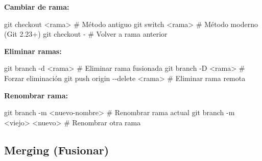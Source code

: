 \documentclass[
  doc,
  floatsintext,
  longtable,
  a4paper,
  nolmodern,
  notxfonts,
  notimes,
  12pt,
  colorlinks=true,linkcolor=blue,citecolor=blue,urlcolor=blue]{apa7}
\newenvironment{Shaded}{\begin{snugshade}}{\end{snugshade}}
\newcommand{\AttributeTok}[1]{\textcolor[rgb]{0.40,0.45,0.13}{#1}}
\newcommand{\CommentTok}[1]{\textcolor[rgb]{0.37,0.37,0.37}{#1}}
\newcommand{\FunctionTok}[1]{\textcolor[rgb]{0.28,0.35,0.67}{#1}}
\newcommand{\NormalTok}[1]{\textcolor[rgb]{0.00,0.23,0.31}{#1}}
\newcommand{\OperatorTok}[1]{\textcolor[rgb]{0.37,0.37,0.37}{#1}}
\begin{document}
\textbf{Cambiar de rama:}

\begin{Shaded}
\begin{Highlighting}[]
\FunctionTok{git}\NormalTok{ checkout }\OperatorTok{\textless{}}\NormalTok{rama}\OperatorTok{\textgreater{}}        \CommentTok{\# Método antiguo}
\FunctionTok{git}\NormalTok{ switch }\OperatorTok{\textless{}}\NormalTok{rama}\OperatorTok{\textgreater{}}          \CommentTok{\# Método moderno (Git 2.23+)}
\FunctionTok{git}\NormalTok{ checkout }\AttributeTok{{-}}             \CommentTok{\# Volver a rama anterior}
\end{Highlighting}
\end{Shaded}

\textbf{Eliminar ramas:}

\begin{Shaded}
\begin{Highlighting}[]
\FunctionTok{git}\NormalTok{ branch }\AttributeTok{{-}d} \OperatorTok{\textless{}}\NormalTok{rama}\OperatorTok{\textgreater{}}       \CommentTok{\# Eliminar rama fusionada}
\FunctionTok{git}\NormalTok{ branch }\AttributeTok{{-}D} \OperatorTok{\textless{}}\NormalTok{rama}\OperatorTok{\textgreater{}}       \CommentTok{\# Forzar eliminación}
\FunctionTok{git}\NormalTok{ push origin }\AttributeTok{{-}{-}delete} \OperatorTok{\textless{}}\NormalTok{rama}\OperatorTok{\textgreater{}}  \CommentTok{\# Eliminar rama remota}
\end{Highlighting}
\end{Shaded}

\textbf{Renombrar rama:}

\begin{Shaded}
\begin{Highlighting}[]
\FunctionTok{git}\NormalTok{ branch }\AttributeTok{{-}m} \OperatorTok{\textless{}}\NormalTok{nuevo{-}nombre}\OperatorTok{\textgreater{}}     \CommentTok{\# Renombrar rama actual}
\FunctionTok{git}\NormalTok{ branch }\AttributeTok{{-}m} \OperatorTok{\textless{}}\NormalTok{viejo}\OperatorTok{\textgreater{}} \OperatorTok{\textless{}}\NormalTok{nuevo}\OperatorTok{\textgreater{}}    \CommentTok{\# Renombrar otra rama}
\end{Highlighting}
\end{Shaded}

\subsection{Merging (Fusionar)}\label{merging-fusionar}
\end{document}

